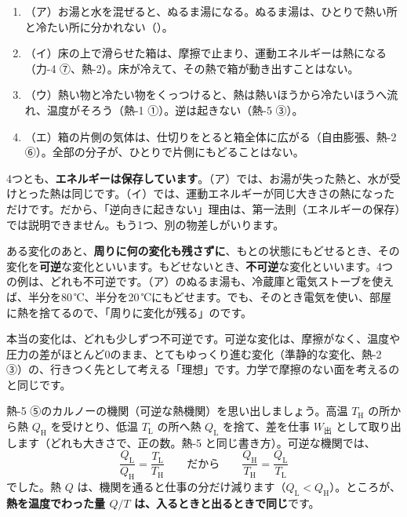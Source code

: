 \begin{enumerate}[label={\bkcircled{\arabic*}}, leftmargin=2.4\zw, itemsep=1pt, topsep=2pt]
\item （ア）お湯と水を混ぜると、ぬるま湯になる。ぬるま湯は、ひとりで熱い所と冷たい所に分かれない（\bkhatenaref）。
\item （イ）床の上で滑らせた箱は、摩擦で止まり、運動エネルギーは熱になる（力-4 ⑦、熱-2）。床が冷えて、その熱で箱が動き出すことはない。
\item （ウ）熱い物と冷たい物をくっつけると、熱は熱いほうから冷たいほうへ流れ、温度がそろう（熱-1 ①）。逆は起きない（熱-5 ③）。
\item （エ）箱の片側の気体は、仕切りをとると箱全体に広がる（自由膨張、熱-2 ⑥）。全部の分子が、ひとりで片側にもどることはない。
\end{enumerate}

4つとも、\textbf{エネルギーは保存しています}。（ア）では、お湯が失った熱と、水が受けとった熱は同じです。（イ）では、運動エネルギーが同じ大きさの熱になっただけです。だから、「逆向きに起きない」理由は、第一法則（エネルギーの保存）では説明できません。もう1つ、別の物差しがいります。

ある変化のあと、\textbf{周りに何の変化も残さずに}、もとの状態にもどせるとき、その変化を\textbf{可逆}な変化といいます。もどせないとき、\textbf{不可逆}な変化といいます。4つの例は、どれも不可逆です。（ア）のぬるま湯も、冷蔵庫と電気ストーブを使えば、半分を80\,℃、半分を20\,℃にもどせます。でも、そのとき電気を使い、部屋に熱を捨てるので、「周りに変化が残る」のです。

\begin{seikaku}
本当の変化は、どれも少しずつ不可逆です。可逆な変化は、摩擦がなく、温度や圧力の差がほとんど0のまま、とてもゆっくり進む変化（準静的な変化、熱-2 ③）の、行きつく先として考える「理想」です。力学で摩擦のない面を考えるのと同じです。
\end{seikaku}

\label{ph:熱-6:sec2}
熱-5 ⑤のカルノーの機関（可逆な熱機関）を思い出しましょう。高温 $T_{\mathrm H}$ の所から熱 $Q_{\mathrm H}$ を受けとり、低温 $T_{\mathrm L}$ の所へ熱 $Q_{\mathrm L}$ を捨て、差を仕事 $W_{\text{出}}$ として取り出します（どれも大きさで、正の数。熱-5 と同じ書き方）。可逆な機関では、
\[\frac{Q_{\mathrm L}}{Q_{\mathrm H}}=\frac{T_{\mathrm L}}{T_{\mathrm H}}\qquad\text{だから}\qquad \frac{Q_{\mathrm H}}{T_{\mathrm H}}=\frac{Q_{\mathrm L}}{T_{\mathrm L}}\]
でした。熱 $Q$ は、機関を通ると仕事の分だけ減ります（$Q_{\mathrm L}<Q_{\mathrm H}$）。ところが、\textbf{熱を温度でわった量 $Q/T$ は、入るときと出るときで同じ}です。


